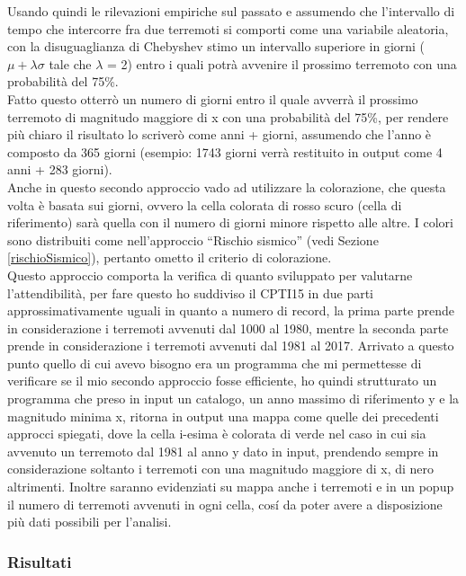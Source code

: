 Usando quindi le rilevazioni empiriche sul passato e assumendo che l'intervallo di tempo che intercorre fra due terremoti si comporti come una variabile aleatoria, con la disuguaglianza di Chebyshev stimo un intervallo superiore in giorni ($\mu + \lambda\sigma$ tale che $\lambda$ = 2) entro i quali potr\`a avvenire il prossimo terremoto con una probabilit\`a del 75\%.\\
Fatto questo otterr\`o un numero di giorni entro il quale avverr\`a il prossimo terremoto di magnitudo maggiore di x con una probabilit\`a del 75\%, per rendere pi\`u chiaro il risultato lo scriver\`o come anni + giorni, assumendo che l'anno \`e composto da 365 giorni (esempio: 1743 giorni verr\`a restituito in output come 4 anni + 283 giorni).\\
Anche in questo secondo approccio vado ad utilizzare la colorazione, che questa volta \`e basata sui giorni, ovvero la cella colorata di rosso scuro (cella di riferimento) sar\`a quella con il numero di giorni minore rispetto alle altre. I colori sono distribuiti come nell'approccio ``Rischio sismico'' (vedi Sezione \ref{rischioSismico}), pertanto ometto il criterio di colorazione.\\
Questo approccio comporta la verifica di quanto sviluppato per valutarne l'attendibilit\`a, per fare questo ho suddiviso il CPTI15 in due parti approssimativamente uguali in quanto a numero di record, la prima parte prende in considerazione i terremoti avvenuti dal 1000 al 1980, mentre la seconda parte prende in considerazione i terremoti avvenuti dal 1981 al 2017. Arrivato a questo punto quello di cui avevo bisogno era un programma che mi permettesse di verificare se il mio secondo approccio fosse efficiente, ho quindi strutturato un programma che preso in input un catalogo, un anno massimo di riferimento y e la magnitudo minima x, ritorna in output una mappa come quelle dei precedenti approcci spiegati, dove la cella i-esima \`e colorata di verde nel caso in cui sia avvenuto un terremoto dal 1981 al anno y dato in input, prendendo sempre in considerazione soltanto i terremoti con una magnitudo maggiore di x, di nero altrimenti. Inoltre saranno evidenziati su mappa anche i terremoti e in un popup il numero di terremoti avvenuti in ogni cella, cos\'i da poter avere a disposizione pi\`u dati possibili per l'analisi.

\subsubsection{Risultati}

